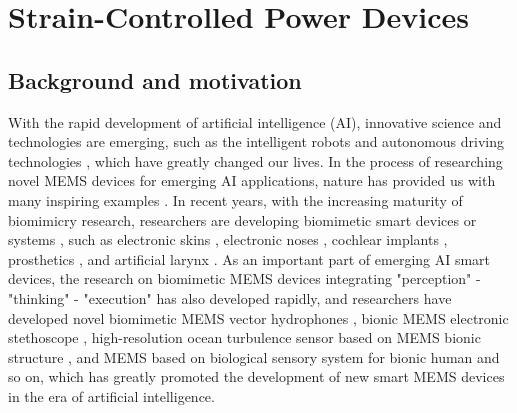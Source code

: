 \chapter{Strain-Controlled Power Devices}
\label{ch:Strain-controlled power devices}

\ifpdf
    \graphicspath{{Chapter3/Figs/Raster/}{Chapter3/Figs/PDF/}{Chapter3/Figs/}}
\else
    \graphicspath{{Chapter3/Figs/Vector/}{Chapter3/Figs/}}
\fi

\section{Background and motivation}
\label{sec:Background and motivation chapter3}

With  the rapid development of artificial intelligence (AI), innovative science and technologies are emerging, such as the intelligent robots and autonomous driving technologies \cite{murphy2019introduction,dikmen2016autonomous}, which have greatly changed our lives. In the process of researching novel MEMS devices for emerging AI applications, nature has provided us with many inspiring examples \cite{wani2017light,zhao2013progressive}. In recent years, with the increasing maturity of biomimicry research, researchers are developing biomimetic smart devices or systems \cite{geiger2011detecting,chun2015iontronics}, such as electronic skins \cite{wagner2004electronic}, electronic noses \cite{rock2008electronic}, cochlear implants \cite{runge2018improved,choi2019aided}, prosthetics \cite{light2000development}, and artificial larynx \cite{lowry1981artificial}. As an important part of emerging AI smart devices, the research on biomimetic MEMS devices integrating "perception" - "thinking" - "execution" has also developed rapidly, and researchers have developed novel biomimetic MEMS vector hydrophones \cite{xue2007design}, bionic  MEMS electronic stethoscope \cite{duan2021bionic}, high-resolution ocean turbulence sensor based on MEMS bionic structure \cite{zhang2020vector}, and MEMS based on biological sensory system for bionic human \cite{karman2011way} and so on, which has greatly promoted the development of new smart MEMS devices in the era of artificial intelligence.

